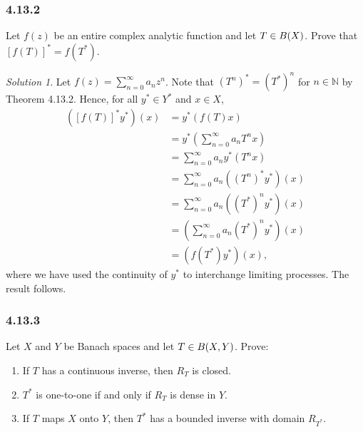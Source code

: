 \documentclass{report}
\newcommand{\bb}[1]{\mathbb{#1}}
\let\sc\relax
\newcommand{\sc}[1]{\mathscr{#1}}
\theoremstyle{remark}
\newtheorem*{solution}{Solution}
\begin{document}
\subsubsection*{4.13.2}
Let $f(z)$ be an entire complex analytic function and let $T \in \sc B(X)$. Prove that $[f(T)]^* = f(T^*)$.

\begin{solution}
  Let $f(z) = \sum_{n=0}^\infty a_n z^n$. Note that $(T^n)^* = (T^*)^n$ for $n \in \bb N$ by Theorem 4.13.2. Hence, for all $y^* \in Y^*$ and $x \in X$,
  \begin{equation*}
    \begin{split}
      ([f(T)]^* y^*)(x) &= y^*(f(T)x) \\
      &= y^*\left( \sum_{n=0}^\infty a_n T^n x \right) \\
      &= \sum_{n=0}^\infty a_n y^*(T^n x) \\
      &= \sum_{n=0}^\infty a_n ((T^n)^* y^*)(x) \\
      &= \sum_{n=0}^\infty a_n ((T^*)^n y^*)(x) \\
      &= \left( \sum_{n=0}^\infty a_n (T^*)^n y^* \right)(x) \\
      &= (f(T^*) y^*)(x),
    \end{split}
  \end{equation*}
  where we have used the continuity of $y^*$ to interchange limiting processes. The result follows.
\end{solution}

\subsubsection*{4.13.3}
Let $X$ and $Y$ be Banach spaces and let $T \in \sc B(X,Y)$. Prove:
\begin{enumerate}[label=(\alph*)]
  \item If $T$ has a continuous inverse, then $R_T$ is closed.
  \item $T^*$ is one-to-one if and only if $R_T$ is dense in $Y$.
  \item If $T$ maps $X$ onto $Y$, then $T^*$ has a bounded inverse with domain $R_{T^*}$.
\end{enumerate}
\end{document}
